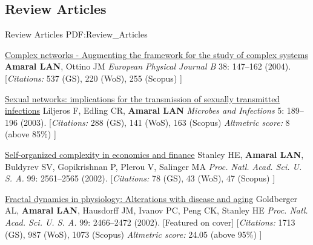 \vspace*{0.2cm}\subsection
{Review Articles}
{Review Articles}
{PDF:Review_Articles}

\GapNoBreak
\NumberedItem{\makebox[0.8cm][r]{[6]}}
\href{/people/amaral/complex-networks-augmenting-the-framework-for-the-study-of-complex-systems}
{Complex networks - Augmenting the framework for the study of complex systems}
\newline
{\textbf{Amaral LAN}}, Ottino JM
\newline
\textit{European Physical Journal B}
    38:
147--162 (2004).
    \newline
    \hfill [{\em{Citations:}} 537 (GS),
    220 (WoS), 255 (Scopus)
    ]
\newline
\Gap
~
\Gap

\NumberedItem{\makebox[0.8cm][r]{[5]}}
\href{/people/amaral/sexual-networks-implications-for-the-transmission-of-sexually-transmitted-infections}
{Sexual networks: implications for the transmission of sexually transmitted infections}
\newline
Liljeros F, Edling CR, {\textbf{Amaral LAN}}
\newline
\textit{Microbes and Infections}
    5:
189--196 (2003).
    \newline
    \hfill [{\em{Citations:}} 288 (GS),
    141 (WoS), 163 (Scopus)
        {\hspace*{1cm} \em{Altmetric score:}}  8 (above 85\%)
    ]
\newline
\Gap
~
\Gap

\NumberedItem{\makebox[0.8cm][r]{[4]}}
\href{/people/amaral/self-organized-complexity-in-economics-and-finance}
{Self-organized complexity in economics and finance}
\newline
Stanley HE, {\textbf{Amaral LAN}}, Buldyrev SV, Gopikrishnan P, Plerou V, Salinger MA
\newline
\textit{Proc. Natl. Acad. Sci. U. S. A.}
    99:
2561--2565 (2002).
    \newline
    \hfill [{\em{Citations:}} 78 (GS),
    43 (WoS), 47 (Scopus)
    ]
\newline
\Gap
~
\Gap

\NumberedItem{\makebox[0.8cm][r]{[3]}}
\href{/people/amaral/fractal-dynamics-in-physiology-alterations-with-disease-and-aging}
{Fractal dynamics in physiology: Alterations with disease and aging}
\newline
Goldberger AL, {\textbf{Amaral LAN}}, Hausdorff JM, Ivanov PC, Peng CK, Stanley HE
\newline
\textit{Proc. Natl. Acad. Sci. U. S. A.}
    99:
2466--2472 (2002).
    [Featured on cover]
    \newline
    \hfill [{\em{Citations:}} 1713 (GS),
    987 (WoS), 1073 (Scopus)
        {\hspace*{1cm} \em{Altmetric score:}}  24.05 (above 95\%)
    ]
\newline
\Gap
~
\Gap

